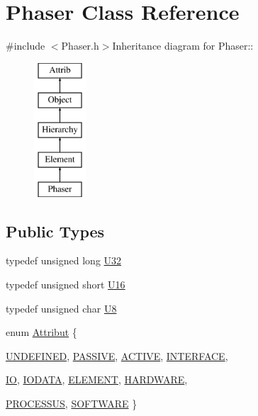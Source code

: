 \hypertarget{classPhaser}{
\section{Phaser Class Reference}
\label{classPhaser}
}


{\ttfamily \#include $<$Phaser.h$>$}Inheritance diagram for Phaser::\begin{figure}[H]
\begin{center}
\leavevmode
\includegraphics[height=5cm]{classPhaser}
\end{center}
\end{figure}
\subsection*{Public Types}
\begin{DoxyCompactItemize}
\item 
typedef unsigned long \hyperlink{classPhaser_a733b5d40a397fc633db055248c76a23f}{U32}
\item 
typedef unsigned short \hyperlink{classPhaser_acadd65d66e8b38a16ad37a23834ee513}{U16}
\item 
typedef unsigned char \hyperlink{classPhaser_a09f745e43da83ab27286e69179755361}{U8}
\item 
enum \hyperlink{classAttrib_a69e171d7cc6417835a5a306d3c764235}{Attribut} \{ \par
\hyperlink{classAttrib_a69e171d7cc6417835a5a306d3c764235a3a8da2ab97dda18aebab196fe4100531}{UNDEFINED}, 
\hyperlink{classAttrib_a69e171d7cc6417835a5a306d3c764235a2bfb2af57b87031d190a05fe25dd92ed}{PASSIVE}, 
\hyperlink{classAttrib_a69e171d7cc6417835a5a306d3c764235a3b1fec929c0370d1436f2f06e298fb0d}{ACTIVE}, 
\hyperlink{classAttrib_a69e171d7cc6417835a5a306d3c764235aa27c16b480a369ea4d18b07b2516bbc7}{INTERFACE}, 
\par
\hyperlink{classAttrib_a69e171d7cc6417835a5a306d3c764235a1420a5b8c0540b2af210b6975eded7f9}{IO}, 
\hyperlink{classAttrib_a69e171d7cc6417835a5a306d3c764235a0af3b0d0ac323c1704e6c69cf90add28}{IODATA}, 
\hyperlink{classAttrib_a69e171d7cc6417835a5a306d3c764235a7788bc5dd333fd8ce18562b269c9dab1}{ELEMENT}, 
\hyperlink{classAttrib_a69e171d7cc6417835a5a306d3c764235a61ceb22149f365f1780d18f9d1459423}{HARDWARE}, 
\par
\hyperlink{classAttrib_a69e171d7cc6417835a5a306d3c764235a75250e29692496e73effca2c0330977f}{PROCESSUS}, 
\hyperlink{classAttrib_a69e171d7cc6417835a5a306d3c764235a103a67cd0b8f07ef478fa45d4356e27b}{SOFTWARE}
 \}
\end{DoxyCompactItemize}
